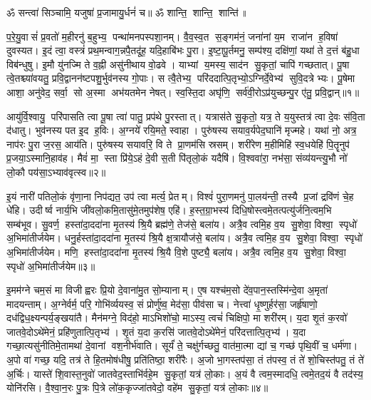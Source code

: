 \setcounter{anuvakam}{0}
ॐ सन्त्वा॑ सिञ्चामि॒ यजुषा॑ प्र॒जामायु॒र्धनं॑ च॥ ॐ शान्ति॒ शान्ति॒ शान्ति॑॥

प॒रे॒यु॒वासं॑ प्र॒वतो॑ म॒हीरनु॑ ब॒हुभ्य॒ पन्था॑मनपस्पशा॒नम्। वै॒व॒स्व॒त स॒ङ्गम॑नं॒ जना॑नां य॒म राजा॑न ह॒विषा॑ दुवस्यत। इ॒दं त्वा॒ वस्त्रं॑ प्रथ॒मन्वाग॒न्नपै॒तदू॑ह॒ यदि॒हाबि॑भः पु॒रा। इ॒ष्टा॒पू॒र्तमनु॒ सम्प॑श्य॒ दक्षि॑णां॒ यथा॑ ते द॒त्तं ब॑हु॒धा विब॑न्धुषु। इ॒मौ यु॑नज्मि ते व॒ह्नी असु॑नीथाय वो॒ढवे। याभ्यां य॒मस्य॒ साद॑न सु॒कृतां॒ चापि॑ गच्छतात्। पू॒षा त्वे॒तश्च्या॑वयतु॒ प्रवि॒द्वानन॑ष्टपशु॒र्भुव॑नस्य गो॒पाः। स त्वै॒तेभ्य॒ परि॑ददात्पि॒तृभ्यो॒ऽग्निर्दे॒वेभ्य॑ सुवि॒दत्रेभ्यः। पू॒षेमा आशा॒ अनु॑वेद॒ सर्वा॒ सो अ॒स्मा अभ॑यतमेन नेषत्। स्व॒स्ति॒दा अघृ॑णि॒ सर्व॑वी॒रोऽप्र॑युच्छन्पु॒र ए॑तु॒ प्रवि॒द्वान्॥१॥

आयु॑र्वि॒श्वायु॒ परि॑पासति त्वा पू॒षा त्वा॑ पातु॒ प्रप॑थे पु॒रस्तात्। यत्रास॑ते सु॒कृतो॒ यत्र॒ ते य॒युस्तत्र॑ त्वा दे॒वः स॑वि॒ता द॑धातु। भुव॑नस्य पत इ॒द ह॒विः। अ॒ग्नये॑ रयि॒मते॒ स्वाहा। पुरु॑षस्य सयाव॒र्यपेद॒घानि॑ मृज्महे। यथा॑ नो॒ अत्र॒ नाप॑रः पु॒रा ज॒रस॒ आय॑ति। पुरु॑षस्य सयावरि॒ वि ते प्रा॒णम॑सि स्रसम्। शरी॑रेण म॒हीमिहि॑ स्व॒धयेहि॑ पि॒तॄनुप॑ प्र॒जया॒ऽस्मानि॒हाव॑ह। मैवं॑ मा॒ स्ता प्रि॑ये॒ऽहं दे॒वी स॒ती पि॑तृलो॒कं यदैषि॑। वि॒श्ववा॑रा॒ नभ॑सा॒ संव्य॑यन्त्यु॒भौ नो॑ लो॒कौ पय॑सा॒ऽभ्याव॑वृत्स्व॥२॥

इ॒यं नारी॑ पतिलो॒कं वृ॑णा॒ना निप॑द्यत॒ उप॑ त्वा मर्त्य॒ प्रेतम्। विश्वं॑ पुरा॒णमनु॑ पा॒लय॑न्ती॒ तस्यै प्र॒जां द्रवि॑णं चे॒ह धे॑हि। उदीर्ष्व नार्य॒भि जी॑वलो॒कमि॒तासु॑मे॒तमुप॑शेष॒ एहि॑। ह॒स्त॒ग्रा॒भस्य॑ दिधि॒षोस्त्वमे॒तत्पत्यु॑र्जनि॒त्वम॒भि सम्ब॑भूव। सु॒वर्ण॒ हस्ता॑दा॒ददा॑ना मृ॒तस्य॑ श्रि॒यै ब्रह्म॑णे॒ तेज॑से॒ बला॑य। अत्रै॒व त्वमि॒ह व॒य सु॒शेवा॒ विश्वा॒ स्पृधो॑ अ॒भिमा॑तीर्जयेम। धनु॒र्\mbox{}हस्ता॑दा॒ददा॑ना मृ॒तस्य॑ श्रि॒यै क्ष॒त्रायौज॑से॒ बला॑य। अत्रै॒व त्वमि॒ह व॒य सु॒शेवा॒ विश्वा॒ स्पृधो॑ अ॒भिमा॑तीर्जयेम। मणि॒ हस्ता॑दा॒ददा॑ना मृ॒तस्य॑ श्रि॒यै वि॒शे पुष्ट्यै॒ बला॑य। अत्रै॒व त्वमि॒ह व॒य सु॒शेवा॒ विश्वा॒ स्पृधो॑ अ॒भिमा॑तीर्जयेम॥३॥

इ॒मम॑ग्ने चम॒सं मा विजीह्वरः प्रि॒यो दे॒वाना॑मु॒त सो॒म्यानाम्। ए॒ष यश्च॑म॒सो दे॑व॒पान॒स्तस्मि॑न्दे॒वा अ॒मृता॑ मादयन्ताम्। अ॒ग्नेर्वर्म॒ परि॒ गोभि॑र्व्ययस्व॒ सं प्रोर्णु॑ष्व॒ मेद॑सा॒ पीव॑सा च। नेत्त्वा॑ धृ॒ष्णुर्\mbox{}हर॑सा॒ जर्\mbox{}हृ॑षाणो॒ दध॑द्विध॒क्ष्यन्पर्य॒ङ्खया॑तै। मैन॑मग्ने॒ विद॑हो॒ माऽभिशो॑चो॒ माऽस्य॒ त्वचं॑ चिक्षिपो॒ मा शरी॑रम्। य॒दा शृ॒तं क॒रवो॑ जातवे॒दोऽथे॑मेनं॒ प्रहि॑णुतात्पि॒तृभ्य॑। शृ॒तं य॒दा क॒रसि॑ जातवे॒दोऽथे॑मेनं॒ परि॑दत्तात्पि॒तृभ्य॑। य॒दा गच्छा॒त्यसु॑नीतिमे॒तामथा॑ दे॒वानां वश॒नीर्भ॑वाति। सूर्यं॑ ते॒ चक्षु॑र्गच्छतु॒ वात॑मा॒त्मा द्यां च॒ गच्छ॑ पृथि॒वीं च॒ धर्म॑णा। अ॒पो वा॑ गच्छ॒ यदि॒ तत्र॑ ते हि॒तमोष॑धीषु॒ प्रति॑तिष्ठा॒ शरी॑रैः। अ॒जो भा॒गस्तप॑सा॒ तं त॑पस्व॒ तं ते॑ शो॒चिस्त॑पतु॒ तं ते॑ अ॒र्चिः। यास्ते॑ शि॒वास्त॒नुवो॑ जातवेद॒स्ताभि॑र्वहे॒म सु॒कृतां॒ यत्र॑ लो॒काः। अ॒यं वै त्वम॒स्मादधि॒ त्वमे॒तद॒यं वै तद॑स्य॒ योनि॑रसि। वै॒श्वा॒न॒रः पु॒त्रः पि॒त्रे लो॑क॒कृज्जा॑तवेदो॒ वहे॑म सु॒कृतां॒ यत्र॑ लो॒काः॥४॥
\anuvakamend[वि॒द्वान॒भ्याव॑वृत्स्वा॒भिमा॑तीर्जयेम॒ शरी॑रैश्च॒त्वारि॑ च]


